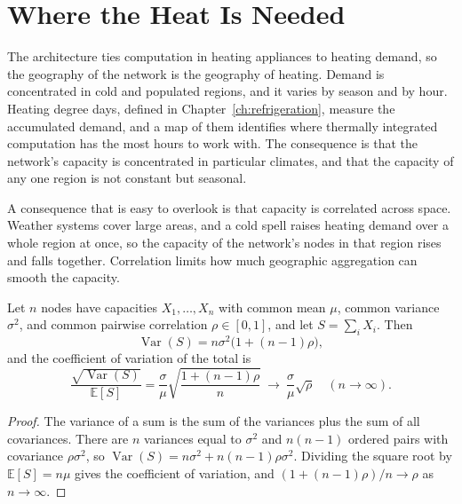 \section{Where the Heat Is Needed}

The architecture ties computation in heating appliances to heating demand, so the geography of the network is the geography of heating. Demand is concentrated in cold and populated regions, and it varies by season and by hour. Heating degree days, defined in Chapter~\ref{ch:refrigeration}, measure the accumulated demand, and a map of them identifies where thermally integrated computation has the most hours to work with. The consequence is that the network's capacity is concentrated in particular climates, and that the capacity of any one region is not constant but seasonal.

A consequence that is easy to overlook is that capacity is correlated across space. Weather systems cover large areas, and a cold spell raises heating demand over a whole region at once, so the capacity of the network's nodes in that region rises and falls together. Correlation limits how much geographic aggregation can smooth the capacity.

\begin{proposition}
\label{prop:diversification}
Let $n$ nodes have capacities $X_1,\dots,X_n$ with common mean $\mu$, common variance $\sigma^{2}$, and common pairwise correlation $\rho\in[0,1]$, and let $S=\sum_iX_i$. Then
\[
\operatorname{Var}(S)=n\sigma^{2}\bigl(1+(n-1)\rho\bigr),
\]
and the coefficient of variation of the total is
\[
\frac{\sqrt{\operatorname{Var}(S)}}{\mathbb E[S]}=\frac{\sigma}{\mu}\sqrt{\frac{1+(n-1)\rho}{n}}\ \longrightarrow\ \frac{\sigma}{\mu}\sqrt{\rho}\quad(n\to\infty).
\]
\end{proposition}

\begin{proof}
The variance of a sum is the sum of the variances plus the sum of all covariances. There are $n$ variances equal to $\sigma^{2}$ and $n(n-1)$ ordered pairs with covariance $\rho\sigma^{2}$, so $\operatorname{Var}(S)=n\sigma^{2}+n(n-1)\rho\sigma^{2}$. Dividing the square root by $\mathbb E[S]=n\mu$ gives the coefficient of variation, and $(1+(n-1)\rho)/n\to\rho$ as $n\to\infty$.
\end{proof}


